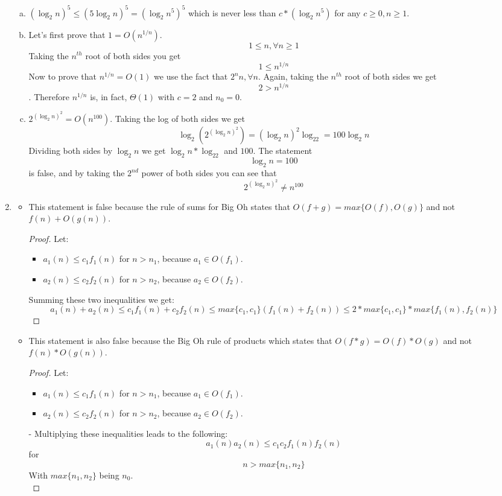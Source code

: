 \begin{enumerate}[1.]
\begin{enumerate}[(a)]
	\item ${(\log_2n)}^5 \leq {(5\log_2n)}^5={(\log_2n^5)}^5$ which is never less than $c*(\log_2n^5)$ for any $c \geq 0, n\geq1$.
	
	\item Let's first prove that $1=O(n^{1/n})$. $$1\leq n, \forall n \geq 1 $$Taking the $n^{th}$ root of both sides you get $$1\leq n^{1/n}$$ Now to prove that $n^{1/n}=O(1)$ we use the fact that $2^n  n, \forall n $. Again, taking the $n^{th}$ root of both sides we get $$2>n^{1/n}$$. Therefore $n^{1/n}$ is, in fact, $\Theta(1)$ with $c=2$ and $n_0=0$. 
	
	\item $2^{(\log_2n)^2}=O(n^{100})$. Taking the log of both sides we get $$\log_2{(2^{(\log_2n)^2})}= (\log_2n)^2\log_22=100\log_2n$$ Dividing both sides by $\log_2n$ we get $\log_2n*\log_22$ and $100$. The statement $$\log_2n=100$$ is false, and by taking the $2^{nd}$ power of both sides you can see that $$2^{(\log_2n)^2}\neq n^{100}$$
		
	\end{enumerate}
	
\item \begin{itemize}
	\item This statement is false because the rule of sums for Big Oh states that $O(f+g)=max\{O(f), O(g)\}$ and not $f(n)+O(g(n))$. 
	\begin{proof} 
	\renewcommand\qedsymbol{QED}
	Let:
		\begin{itemize}  		 \item $a_1(n)\leq c_1f_1(n)$ for $n > n_1$, because $a_1 \in O(f_1)$.
		 \item $a_2(n) \leq c_2f_2(n)$ for $n > n_2$, because $a_2 \in O(f_2)$.
		\end{itemize}
		Summing these two inequalities we get: \\
		$$ {a_1(n)+a_2(n) \leq c_1f_1(n)+c_2f_2(n) \leq max\{c_1,c_1\}(f_1(n)+f_2(n)) \leq 2*max\{c_1,c_1\}*max\{f_1(n),f_2(n)\}} $$
	\end{proof}
	
	
	
	
	\item This statement is also false because the Big Oh rule of products which states that $O(f * g)=O(f)*O(g)$ and not $f(n)*O(g(n))$.
	\begin{proof} 
	\renewcommand\qedsymbol{QED}
	Let:
		\begin{itemize}
		 \item $a_1(n)\leq c_1f_1(n)$ for $n>n_1$, because $a_1 \in O(f_1)$.
		 \item $a_2(n) \leq c_2f_2(n)$ for $n>n_2$, because $a_2 \in O(f_2)$.
		\end{itemize}-
	Multiplying these inequalities leads to the following:\\
	$$ a_1(n)a_2(n)\leq c_1c_2f_1(n)f_2(n)$$ for $$n>max\{n_1, n_2 \}$$
	With $max\{n_1, n_2 \}$ being $n_0$.\\
	

\end{proof}
\end{itemize}
\end{enumerate}
